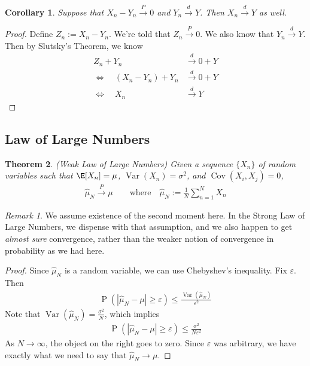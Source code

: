 \documentclass[12pt]{article}
\theoremstyle{plain}
\newtheorem{thm}{Theorem}[section]
\newtheorem{cor}[thm]{Corollary}
\theoremstyle{definition}
\theoremstyle{remark}
\newtheorem*{rmk}{Remark}
\newcommand{\ra}{\rightarrow}
\newcommand{\Cov}{\operatorname{Cov}}
\newcommand{\Prb}{\operatorname{P}}
\newcommand{\Var}{\operatorname{Var}}
\newcommand{\pto}{\xrightarrow{P}}
\newcommand{\dto}{\xrightarrow{d}}
\newcommand{\sumnN}{\sum^N_{n=1}}
\begin{document}
\begin{cor}
Suppose that $X_n - Y_n\pto 0$ and $Y_n\dto Y$. Then $X_n \dto Y$ as
well.
\end{cor}
\begin{proof}
Define $Z_n := X_n - Y_n$. We're told that $Z_n\pto 0$. We also know
that $Y_n\dto Y$. Then by Slutsky's Theorem, we know
\begin{align*}
  Z_n + Y_n &\dto 0 + Y \\
  \iff\quad (X_n-Y_n) + Y_n &\dto 0 + Y \\
  \iff\quad X_n &\dto Y
\end{align*}
\end{proof}



\clearpage
\subsection{Law of Large Numbers}

\begin{thm}\emph{(Weak Law of Large Numbers)}
Given a sequence $\{X_n\}$ of random variables such that
$\E[X_n]=\mu$, $\Var(X_n)=\sigma^2$, and $\Cov(X_i,X_j)=0$,
\begin{align*}
  \hat{\mu}_N \pto \mu
  \qquad\text{where} \quad
  \hat{\mu}_N := \frac{1}{N} \sumnN X_n
\end{align*}
\end{thm}
\begin{rmk}
We assume existence of the second moment here. In the Strong Law of
Large Numbers, we dispense with that assumption, and we also happen to
get \emph{almost sure} convergence, rather than the weaker notion of
convergence in probability as we had here.
\end{rmk}
\begin{proof}
Since $\hat{\mu}_N$ is a random variable, we can use Chebyshev's
inequality. Fix $\varepsilon$. Then
\begin{align*}
  \Prb(|\hat{\mu}_N -\mu| \geq \varepsilon)
  \leq \frac{\Var(\hat{\mu}_N)}{\varepsilon^2}
\end{align*}
Note that $\Var(\hat{\mu}_N) = \frac{\sigma^2}{N}$, which implies
\begin{align*}
  \Prb(|\hat{\mu}_N -\mu| \geq \varepsilon)
  \leq \frac{\sigma^2}{N\varepsilon^2}
\end{align*}
As $N\ra\infty$, the object on the right goes to zero. Since
$\varepsilon$ was arbitrary, we have exactly what we need to say that
$\hat{\mu}_N\ra\mu$.
\end{proof}
\end{document}
